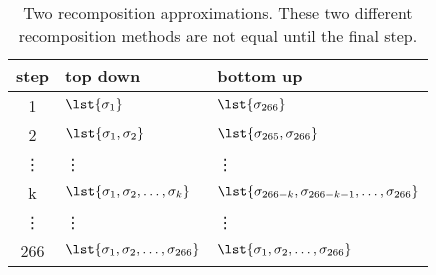 \begin{table}[htdp]
\caption[Two recomposition approximations]{Two recomposition approximations. These two different recomposition methods are not equal until the final step.}
\begin{center}
\begin{tabular}{cll}
%
 step & top down & bottom up \\\hline
%
 1 & $\lst{\sigma_{1}}$ & $\lst{\sigma_{266}}$ \\
%
 2 & $\lst{\sigma_{1},\sigma_{2}}$ & $\lst{\sigma_{265},\sigma_{266}}$ \\
%
 \vdots & \vdots & \vdots \\
%
 k & $\lst{\sigma_{1},\sigma_{2},\hdots,\sigma_{k}}$ & $\lst{\sigma_{266-k},\sigma_{266-k-1},\hdots,\sigma_{266}}$ \\
%
 \vdots & \vdots & \vdots \\
%
 266 & $\lst{\sigma_{1},\sigma_{2},\hdots,\sigma_{266}}$ & $\lst{\sigma_{1},\sigma_{2},\hdots,\sigma_{266}}$ \\
%
\end{tabular}
\end{center}
\label{default}
\end{table}%

\endinput